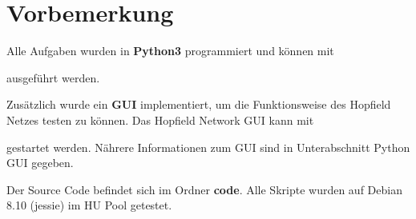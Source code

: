 \section{Vorbemerkung}

Alle Aufgaben wurden in \textbf{Python3} programmiert und können mit


\noindent ausgeführt werden. 

Zusätzlich wurde ein \textbf{GUI} implementiert, um die Funktionsweise des Hopfield Netzes testen zu können. Das Hopfield Network GUI kann mit


\noindent gestartet werden. Nährere Informationen zum GUI sind in Unterabschnitt Python GUI gegeben.

Der Source Code befindet sich im Ordner \textbf{code}. Alle Skripte wurden auf Debian 8.10 (jessie) im HU Pool getestet. 

\clearpage
